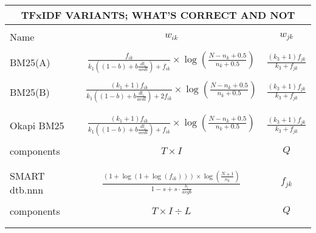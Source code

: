 \begin{table}
  \centering
  \small
  \begin{minipage}[t]{0.65\textwidth}
    
    \begin{tabular}{lcc}
      \multicolumn{3}{c}{TFxIDF VARIANTS; WHAT'S CORRECT AND NOT}\\
      \hline\hline
      \\
      Name & $w_{ik}$ & $w_{jk}$\\
      \hline
      \\
      BM25(A)
      & $\frac{f_{ik}}{k_{1}((1-b)+b\frac{dl_{i}}{avdl})+f_{ik}} \times \log(\frac{N-n_{k}+0.5}{n_{k}+0.5})$
      & $\frac{(k_{3}+1)f_{jk}}{k_{3}+f_{jk}}$ \\
      \\
      BM25(B)
      & $\frac{(k_{1}+1)f_{ik}}{k_{1}((1-b)+b\frac{dl_{i}}{avdl})+2f_{ik}} \times \log(\frac{N-n_{k}+0.5}{n_{k}+0.5})$
      & $\frac{(k_{3}+1)f_{jk}}{k_{3}+f_{jk}}$ \\
      \\\hline
      \\
      Okapi BM25
      & $\frac{(k_{1}+1)f_{ik}}{k_{1}((1-b)+b\frac{dl_{i}}{avdl})+f_{ik}} \times \log(\frac{N-n_{k}+0.5}{n_{k}+0.5})$
      & $\frac{(k_{3}+1)f_{jk}}{k_{3}+f_{jk}}$ \\
      \\
      components & $T \times I$ & $Q$ \\
      \\\hline
      \\
      SMART dtb.nnn
      & $\frac{(1+\log(1+\log(f_{ik}))) \times \log(\frac{N+1}{n_{k}})}{1-s+s \cdot \frac{b_{i}}{avgb}}$
      & $f_{jk}$ \\
      \\
      components & $T \times I \div L$ & $Q$ \\
      \\\hline\hline
      \label{tab:tfxidf}
    \end{tabular}


\end{minipage}
\end{table}
